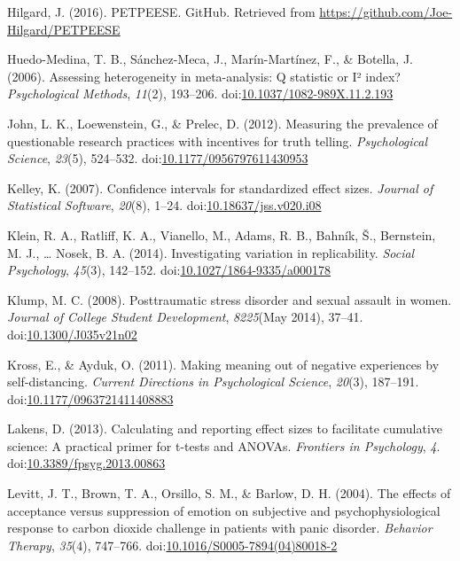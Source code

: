 \documentclass[man]{apa6}
\theoremstyle{definition}
\theoremstyle{definition}
\theoremstyle{definition}
\theoremstyle{remark}
\begin{document}
\hypertarget{ref-Hilgard2016}{}
Hilgard, J. (2016). PETPEESE. GitHub. Retrieved from
\url{https://github.com/Joe-Hilgard/PETPEESE}

\hypertarget{ref-Huedo-Medina2006}{}
Huedo-Medina, T. B., Sánchez-Meca, J., Marín-Martínez, F., \& Botella,
J. (2006). Assessing heterogeneity in meta-analysis: Q statistic or I²
index? \emph{Psychological Methods}, \emph{11}(2), 193--206.
doi:\href{https://doi.org/10.1037/1082-989X.11.2.193}{10.1037/1082-989X.11.2.193}

\hypertarget{ref-John2012}{}
John, L. K., Loewenstein, G., \& Prelec, D. (2012). Measuring the
prevalence of questionable research practices with incentives for truth
telling. \emph{Psychological Science}, \emph{23}(5), 524--532.
doi:\href{https://doi.org/10.1177/0956797611430953}{10.1177/0956797611430953}

\hypertarget{ref-Kelley2007}{}
Kelley, K. (2007). Confidence intervals for standardized effect sizes.
\emph{Journal of Statistical Software}, \emph{20}(8), 1--24.
doi:\href{https://doi.org/10.18637/jss.v020.i08}{10.18637/jss.v020.i08}

\hypertarget{ref-Klein2014a}{}
Klein, R. A., Ratliff, K. A., Vianello, M., Adams, R. B., Bahník, Š.,
Bernstein, M. J., \ldots{} Nosek, B. A. (2014). Investigating variation
in replicability. \emph{Social Psychology}, \emph{45}(3), 142--152.
doi:\href{https://doi.org/10.1027/1864-9335/a000178}{10.1027/1864-9335/a000178}

\hypertarget{ref-Klump2008}{}
Klump, M. C. (2008). Posttraumatic stress disorder and sexual assault in
women. \emph{Journal of College Student Development}, \emph{8225}(May
2014), 37--41.
doi:\href{https://doi.org/10.1300/J035v21n02}{10.1300/J035v21n02}

\hypertarget{ref-Kross2011}{}
Kross, E., \& Ayduk, O. (2011). Making meaning out of negative
experiences by self-distancing. \emph{Current Directions in
Psychological Science}, \emph{20}(3), 187--191.
doi:\href{https://doi.org/10.1177/0963721411408883}{10.1177/0963721411408883}

\hypertarget{ref-Lakens2013}{}
Lakens, D. (2013). Calculating and reporting effect sizes to facilitate
cumulative science: A practical primer for t-tests and ANOVAs.
\emph{Frontiers in Psychology}, \emph{4}.
doi:\href{https://doi.org/10.3389/fpsyg.2013.00863}{10.3389/fpsyg.2013.00863}

\hypertarget{ref-Levitt2004}{}
Levitt, J. T., Brown, T. A., Orsillo, S. M., \& Barlow, D. H. (2004).
The effects of acceptance versus suppression of emotion on subjective
and psychophysiological response to carbon dioxide challenge in patients
with panic disorder. \emph{Behavior Therapy}, \emph{35}(4), 747--766.
doi:\href{https://doi.org/10.1016/S0005-7894(04)80018-2}{10.1016/S0005-7894(04)80018-2}
\end{document}
